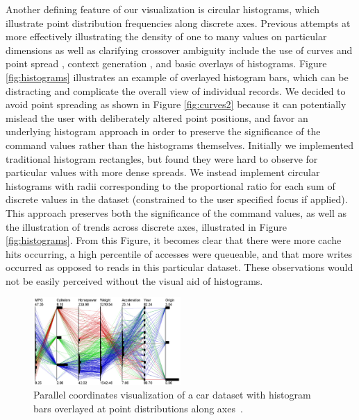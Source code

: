 \documentclass[journal]{vgtc}                %
\begin{document}
Another defining feature of our visualization is circular histograms, which illustrate point distribution frequencies along discrete axes. Previous attempts at more effectively illustrating the density of one to many values on particular dimensions as well as clarifying crossover ambiguity include the use of curves and point spread \cite{Graham:2003:UCE}, context generation \cite{novotny:2006:OPFC}, and basic overlays of histograms. Figure \ref{fig:histograms} illustrates an example of overlayed histogram bars, which can be distracting and complicate the overall view of individual records. We decided to avoid point spreading as shown in Figure \ref{fig:curves2} because it can potentially mislead the user with deliberately altered point positions, and favor an underlying histogram approach in order to preserve the significance of the command values rather than the histograms themselves. Initially we implemented traditional histogram rectangles, but found they were hard to observe for particular values with more dense spreads. We instead implement circular histograms with radii corresponding to the proportional ratio for each sum of discrete values in the dataset (constrained to the user specified focus if applied). This approach preserves both the significance of the command values, as well as the illustration of trends across discrete axes, illustrated in Figure \ref{fig:histograms}. From this Figure, it becomes clear that there were more cache hits occurring, a high percentile of accesses were queueable, and that more writes occurred as opposed to reads in this particular dataset. These observations would not be easily perceived without the visual aid of histograms.

\begin{figure}[h!]
 \centering
 \includegraphics[width=0.5\textwidth]{images/histograms.eps}
 \caption[Parallel coordinates visualization with histogram bars overlayed.]{Parallel coordinates visualization of a car dataset with histogram bars overlayed at point distributions along axes~\cite{McDonnell_Mueller_2008}.}
 \label{fig:histograms_ex}
\end{figure}
\end{document}

